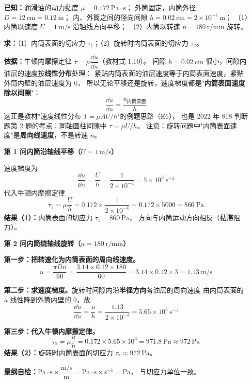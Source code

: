 \begin{jie}
\textbf{已知：}润滑油的动力黏度 $\mu=0.172\ \mathrm{Pa\cdot s}$；
外筒固定，内筒外径 $D=12\ \mathrm{cm}=0.12\ \mathrm{m}$；
内、外筒之间的径向间隙 $h=0.02\ \mathrm{cm}=2\times10^{-4}\ \mathrm{m}$；
（1）内筒以速度 $U=1\ \mathrm{m/s}$ 沿轴线方向平移；
（2）内筒以转速 $n=180\ \mathrm{r/min}$ 旋转。

\textbf{求：}（1）内筒表面的切应力 $\tau_1$；（2）旋转时内筒表面的切应力 $\tau_2$。

\textbf{依据：}牛顿内摩擦定律 $\tau=\mu\dfrac{\dd u}{\dd n}$（教材式 1.10）。
间隙 $h=0.02\ \mathrm{cm}$ 很小，间隙内油层的速度按\textbf{线性分布}处理：
紧贴内筒表面的油层速度等于内筒表面速度，紧贴外筒内壁的油层速度为 $0$，
所以无论平移还是旋转，速度梯度都是"\textbf{内筒表面速度除以间隙}"：
\[ \frac{\dd u}{\dd n}=\frac{u_{\text{内筒表面}}}{h} \]
这正是教材"速度线性分布 $T=\mu A U/h$"的例题思路（E6），
也是 2022 年 818 判断题第 2 题的考点：同轴圆柱间隙中 $\tau=\mu U/h$。
注意：旋转问题中"内筒表面速度"是\textbf{周向线速度}，不是转速 $n$。

\textbf{第 1 问\quad 内筒沿轴线平移（$U=1\ \mathrm{m/s}$）}

速度梯度为
\[ \frac{\dd u}{\dd n}=\frac{U}{h}=\frac{1}{2\times10^{-4}}=5\times10^{3}\ \mathrm{s^{-1}} \]
代入牛顿内摩擦定律
\[ \tau_1=\mu\frac{U}{h}=0.172\times\frac{1}{2\times10^{-4}}
   =0.172\times5000=860\ \mathrm{Pa} \]
\textbf{结果（1）：}内筒表面的切应力 $\tau_1=860\ \mathrm{Pa}$，
方向与内筒运动方向相反（黏滞阻力）。

\textbf{第 2 问\quad 内筒绕轴线旋转（$n=180\ \mathrm{r/min}$）}

\textbf{第一步：把转速化为内筒表面的周向线速度。}
\[ u=\frac{\pi D n}{60}
   =\frac{3.14\times0.12\times180}{60}
   =3.14\times0.12\times3=1.13\ \mathrm{m/s} \]

\textbf{第二步：求速度梯度。}旋转时间隙内沿\textbf{半径方向}各油层的周向速度
由内筒表面的 $u$ 线性降到外筒内壁的 $0$，故
\[ \frac{\dd u}{\dd n}=\frac{u}{h}=\frac{1.13}{2\times10^{-4}}
   =5.65\times10^{3}\ \mathrm{s^{-1}} \]

\textbf{第三步：代入牛顿内摩擦定律。}
\[ \tau_2=\mu\frac{u}{h}=0.172\times5.65\times10^{3}
   =971.8\ \mathrm{Pa}\approx972\ \mathrm{Pa} \]
\textbf{结果（2）：}旋转时内筒表面的切应力 $\tau_2\approx972\ \mathrm{Pa}$。

\textbf{量纲自检：}$\mathrm{Pa\cdot s}\times\dfrac{\mathrm{m/s}}{\mathrm{m}}
=\mathrm{Pa\cdot s}\times\mathrm{s^{-1}}=\mathrm{Pa}$，
与切应力单位一致。
\end{jie}

